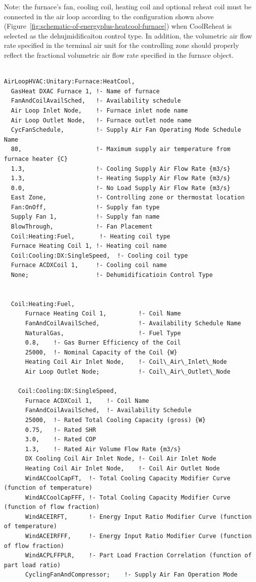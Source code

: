 Note: the furnace's fan, cooling coil, heating coil and optional reheat coil must be connected in the air loop according to the configuration shown above (Figure~\ref{fig:schematic-of-energyplus-heatcool-furnace}) when CoolReheat is selected as the dehujmidificaiton control type. In addition, the volumetric air flow rate specified in the terminal air unit for the controlling zone should properly reflect the fractional volumetric air flow rate specified in the furnace object.

\begin{lstlisting}

AirLoopHVAC:Unitary:Furnace:HeatCool,
  GasHeat DXAC Furnace 1, !- Name of furnace
  FanAndCoilAvailSched,   !- Availability schedule
  Air Loop Inlet Node,    !- Furnace inlet node name
  Air Loop Outlet Node,   !- Furnace outlet node name
  CycFanSchedule,         !- Supply Air Fan Operating Mode Schedule Name
  80,                     !- Maximum supply air temperature from furnace heater {C}
  1.3,                    !- Cooling Supply Air Flow Rate {m3/s}
  1.3,                    !- Heating Supply Air Flow Rate {m3/s}
  0.0,                    !- No Load Supply Air Flow Rate {m3/s}
  East Zone,              !- Controlling zone or thermostat location
  Fan:OnOff,              !- Supply fan type
  Supply Fan 1,           !- Supply fan name
  BlowThrough,            !- Fan Placement
  Coil:Heating:Fuel,       !- Heating coil type
  Furnace Heating Coil 1, !- Heating coil name
  Coil:Cooling:DX:SingleSpeed,  !- Cooling coil type
  Furnace ACDXCoil 1,     !- Cooling coil name
  None;                   !- Dehumidificatioin Control Type


  Coil:Heating:Fuel,
      Furnace Heating Coil 1,         !- Coil Name
      FanAndCoilAvailSched,           !- Availability Schedule Name
      NaturalGas,                     !- Fuel Type
      0.8,    !- Gas Burner Efficiency of the Coil
      25000,  !- Nominal Capacity of the Coil {W}
      Heating Coil Air Inlet Node,    !- Coil\_Air\_Inlet\_Node
      Air Loop Outlet Node;           !- Coil\_Air\_Outlet\_Node

    Coil:Cooling:DX:SingleSpeed,
      Furnace ACDXCoil 1,    !- Coil Name
      FanAndCoilAvailSched,  !- Availability Schedule
      25000,  !- Rated Total Cooling Capacity (gross) {W}
      0.75,   !- Rated SHR
      3.0,    !- Rated COP
      1.3,    !- Rated Air Volume Flow Rate {m3/s}
      DX Cooling Coil Air Inlet Node, !- Coil Air Inlet Node
      Heating Coil Air Inlet Node,    !- Coil Air Outlet Node
      WindACCoolCapFT,  !- Total Cooling Capacity Modifier Curve (function of temperature)
      WindACCoolCapFFF, !- Total Cooling Capacity Modifier Curve (function of flow fraction)
      WindACEIRFT,      !- Energy Input Ratio Modifier Curve (function of temperature)
      WindACEIRFFF,     !- Energy Input Ratio Modifier Curve (function of flow fraction)
      WindACPLFFPLR,    !- Part Load Fraction Correlation (function of part load ratio)
      CyclingFanAndCompressor;    !- Supply Air Fan Operation Mode


\end{lstlisting}
